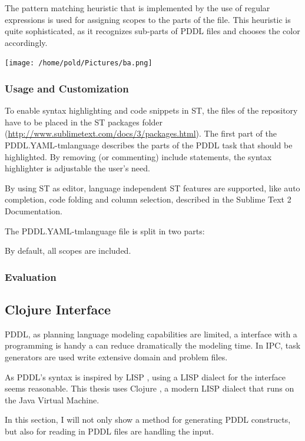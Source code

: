 \documentclass[11pt]{article}
\begin{document}
The pattern matching heuristic that is implemented by the use of
regular expressions is used for assigning scopes to the parts of the
file. This heuristic is quite sophisticated, as it recognizes
sub-parts of PDDL files and chooses the color accordingly. 

\texttt{[image: /home/pold/Pictures/ba.png]}

\subsubsection{Usage and Customization}
\label{sec-4-2-2}
To enable syntax highlighting and code snippets in ST, the files of
the repository have to be placed in the ST packages folder
(\url{http://www.sublimetext.com/docs/3/packages.html}). The first part of the
PDDL.YAML-tmlanguage describes the parts of the PDDL task that should
be highlighted. By removing (or commenting) include statements, the
syntax highlighter is adjustable the user's need.

By using ST as editor, language independent ST features are supported,
like auto completion, code folding and column selection, described in
the Sublime Text 2 Documentation.



The PDDL.YAML-tmlanguage file is split in two parts:

By default, all scopes are included.

\subsubsection{Evaluation}
\label{sec-4-2-3}

\subsection{Clojure Interface}
\label{sec-4-3}

PDDL, as planning language modeling capabilities are limited, a
interface with a programming is handy a can reduce dramatically the
modeling time. In IPC, task generators are used write extensive domain
and problem files. 

As PDDL's syntax is inspired by LISP \parencite[64]{fox2003pddl2},
using a LISP dialect for the interface seems reasonable. This thesis
uses Clojure \parencite{hickey2008clojure}, a modern LISP
dialect that runs on the Java Virtual Machine.

In this section, I will not only show a method for generating PDDL
constructs, but also for reading in PDDL files are handling the input.
\end{document}
